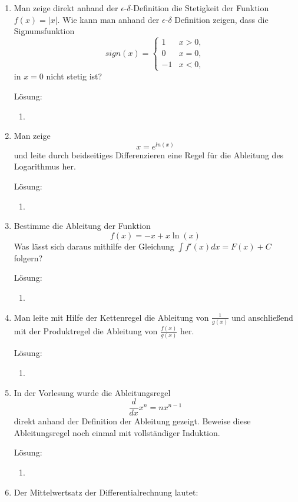 \documentclass[main.tex]{subfiles}
\begin{document}
\begin{enumerate}
	\item Man zeige direkt anhand der \( \epsilon \)-\( \delta \)-Definition die Stetigkeit der Funktion
	      \( f(x) = |x| \).
	      Wie kann man anhand der \( \epsilon \)-\(\delta \) Definition zeigen, dass die Signumsfunktion
	      \[ sign(x)= \begin{cases}
			      1  & x > 0, \\
			      0  & x = 0, \\
			      -1 & x < 0,
		      \end{cases}
	      \]
		  in \( x = 0 \) nicht stetig ist? 
		  
		  Lösung:
		  \begin{enumerate}
			  \item 
		  \end{enumerate}
	\item Man zeige
	      \[ x = e^{ln(x)} \]
	      und leite durch beidseitiges Differenzieren eine Regel für
	      die Ableitung des Logarithmus her.
		  
		  Lösung:
		  \begin{enumerate}
			  \item 
		  \end{enumerate}
	\item Bestimme die Ableitung der Funktion
	      \[ f(x) = -x + x \ln(x) \]
	      Was lässt sich daraus mithilfe der Gleichung
	      \( \int f'(x) dx = F(x) + C \) folgern?
		  
		  Lösung:
		  \begin{enumerate}
			  \item 
		  \end{enumerate}
	\item Man leite mit Hilfe der Kettenregel die Ableitung von \( \frac{1}{ g(x) } \) und anschließend
	      mit der Produktregel die Ableitung von \( \frac{ f(x) }{ g(x) } \) her.
		  
		  Lösung:
		  \begin{enumerate}
			  \item 
		  \end{enumerate}
	\item In der Vorlesung wurde die Ableitungsregel
	      \[ \frac{d}{dx} x^n = nx^{n-1} \]
	      direkt anhand der Definition der Ableitung gezeigt. Beweise diese Ableitungsregel
	      noch einmal mit vollständiger Induktion.
		  
		  Lösung:
		  \begin{enumerate}
			  \item 
		  \end{enumerate}
	\item Der Mittelwertsatz der Differentialrechnung lautet:


\end{enumerate}
\end{document}
